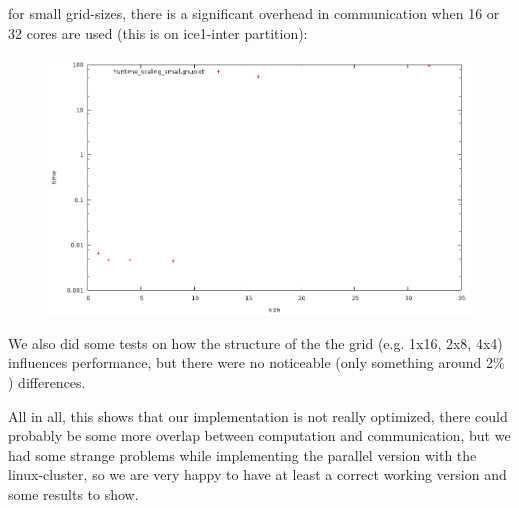 \documentclass[a4paper,10pt]{article}
\begin{document}
for small grid-sizes, there is a significant overhead in communication when 16 or 32 cores are used (this is on ice1-inter partition):
\begin{figure}[h!]
 \centering
 \includegraphics[width=1.0\textwidth]{10/runtime_scaling_small.png}
\end{figure}

We also did some tests on how the structure of the the grid (e.g. 1x16, 2x8, 4x4) influences performance, but there were no noticeable (only something around 2\% ) differences.

All in all, this shows that our implementation is not really optimized, there could probably be some more overlap between computation and communication, but we had some strange problems while implementing the parallel version with the linux-cluster, so we are very happy to have at least a correct working version and some results to show.
\end{document}
